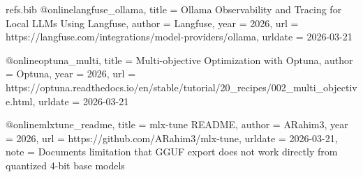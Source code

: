 \begin{filecontents*}{refs.bib}
    @online{langfuse_ollama,
      title   = {Ollama Observability and Tracing for Local LLMs Using Langfuse},
      author  = {{Langfuse}},
      year    = {2026},
      url     = {https://langfuse.com/integrations/model-providers/ollama},
      urldate = {2026-03-21}
    }
    
    @online{optuna_multi,
      title   = {Multi-objective Optimization with Optuna},
      author  = {{Optuna}},
      year    = {2026},
      url     = {https://optuna.readthedocs.io/en/stable/tutorial/20_recipes/002_multi_objective.html},
      urldate = {2026-03-21}
    }
    
    @online{mlxtune_readme,
      title   = {mlx-tune README},
      author  = {{ARahim3}},
      year    = {2026},
      url     = {https://github.com/ARahim3/mlx-tune},
      urldate = {2026-03-21},
      note    = {Documents limitation that GGUF export does not work directly from quantized 4-bit base models}
    }
    \end{filecontents*}
    
    \documentclass[11pt]{article}
    \usepackage[margin=1in]{geometry}
    \usepackage[T1]{fontenc}
    \usepackage[utf8]{inputenc}
    \usepackage{lmodern}
    \usepackage{microtype}
    \usepackage{setspace}
    \usepackage{amsmath,amssymb,amsthm,mathtools}
    \usepackage{bm}
    \usepackage{booktabs,longtable,array,tabularx,multirow}
    \usepackage{enumitem}
    \usepackage{xcolor}
    \usepackage{listings}
    \usepackage{hyperref}
    \usepackage[nameinlink,noabbrev]{cleveref}
    \usepackage{algorithm}
    \usepackage{algpseudocode}
    \usepackage{tikz}
    \usepackage{pgfplots}
    \pgfplotsset{compat=1.18}
    \usepackage{float}
    \usepackage{csquotes}
    \usepackage[backend=biber,style=ieee]{biblatex}
    
    
    
    
